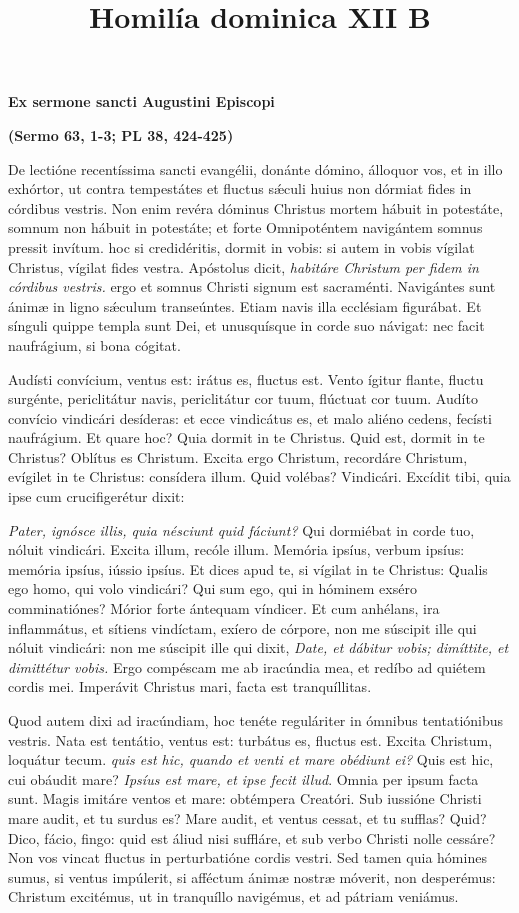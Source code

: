 \documentclass[options]{article}
\title{Homilía dominica XII B}
\begin{document}
	\textbf{Ex sermone sancti Augustini Episcopi }
	
	\textbf{(Sermo 63, 1-3; PL 38, 424-425)}
	
De lectióne recentíssima sancti evangélii, donánte dómino, álloquor vos, et in illo exhórtor, ut contra tempestátes et fluctus s\'{æ}culi huius non dórmiat fides in córdibus vestris. Non enim revéra dóminus Christus mortem hábuit in potestáte, somnum non hábuit in potestáte; et forte Omnipoténtem navigántem somnus pressit invítum. hoc si credidéritis, dormit in vobis: si autem in vobis vígilat Christus, vígilat fides vestra. Apóstolus dicit, 
\textit{habitáre Christum per fidem in córdibus vestris.} 
ergo et somnus Christi signum est sacraménti. Navigántes sunt ánimæ in ligno s\'{æ}culum transeúntes. Etiam navis illa ecclésiam figurábat. Et sínguli quippe templa sunt Dei, et unusquísque in corde suo návigat: nec facit naufrágium, si bona cógitat. 

Audísti convícium, ventus est: irátus es, fluctus est. Vento ígitur flante, fluctu surgénte, periclitátur navis, periclitátur cor tuum, flúctuat cor tuum. Audíto convício vindicári desíderas: et ecce vindicátus es, et malo aliéno cedens, fecísti naufrágium. Et quare hoc? Quia dormit in te Christus. Quid est, dormit in te Christus? Oblítus es Christum. Excita ergo Christum, recordáre Christum, evígilet in te Christus: consídera illum. Quid volébas? Vindicári. Excídit tibi, quia ipse cum crucifigerétur dixit:

\textit{Pater, ignósce illis, quia nésciunt quid fáciunt?} 
Qui dormiébat in corde tuo, nóluit vindicári. Excita illum, recóle illum. Memória ipsíus, verbum ipsíus: memória ipsíus, iússio ipsíus. Et dices apud te, si vígilat in te Christus: Qualis ego homo, qui volo vindicári? Qui sum ego, qui in hóminem exséro comminatiónes? Mórior forte ántequam víndicer. Et cum anhélans, ira inflammátus, et sítiens vindíctam, exíero de córpore, non me súscipit ille qui nóluit vindicári: non me súscipit ille qui dixit, 
\textit{Date, et dábitur vobis; dimíttite, et dimittétur vobis.} 
Ergo compéscam me ab iracúndia mea, et redíbo ad quiétem cordis mei. Imperávit Christus mari, facta est tranquíllitas. 

Quod autem dixi ad iracúndiam, hoc tenéte reguláriter in ómnibus tentatiónibus vestris. Nata est tentátio, ventus est: turbátus es, fluctus est. Excita Christum, loquátur tecum. 
\textit{quis est hic, quando et venti et mare obédiunt ei?} 
Quis est hic, cui obáudit mare? 
\textit{Ipsíus est mare, et ipse fecit illud}. 
Omnia per ipsum facta sunt. Magis imitáre ventos et mare: obtémpera Creatóri. Sub iussióne Christi mare audit, et tu surdus es? Mare audit, et ventus cessat, et tu sufflas? Quid? Dico, fácio, fingo: quid est áliud nisi suffláre, et sub verbo Christi nolle cessáre? Non vos vincat fluctus in perturbatióne cordis vestri. Sed tamen quia hómines sumus, si ventus impúlerit, si afféctum ánimæ nostræ móverit, non desperémus: Christum excitémus, ut in tranquíllo navigémus, et ad pátriam veniámus.
\end{document}
